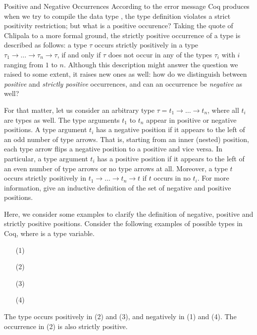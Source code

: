 \begin{excursus}{Positive and Negative Occurrences}
According to the error message Coq produces when we try to compile the data type , the type definition violates a strict positivity restriction; but what is a positive occurence?
Taking the quote of Chlipala to a more formal ground, the strictly positive occurrence of a type is described as follows: a type $\tau$ occurs strictly positively in a type $\tau_1\rightarrow \dots \rightarrow \tau_n \rightarrow \tau$, if and only if $\tau$ does not occur in any of the types $\tau_i$ with $i$ ranging from $1$ to $n$.
Although this description might answer the question we raised to some extent, it raises new ones as well: how do we distinguish between \emph{positive} and \emph{strictly positive} occurrences, and can an occurrence be \emph{negative} as well?

For that matter, let us consider an arbitrary type $\tau = t_1 \rightarrow \dots \rightarrow t_n$, where all $t_i$ are types as well.
The type arguments $t_1$ to $t_n$ appear in positive or negative positions.
A type argument $t_i$ has a negative position if it appears to the left of an odd number of type arrows.
That is, starting from an inner (nested) position, each type arrow flips a negative position to a positive and vice versa.
In particular, a type argument $t_i$ has a positive position if it appears to the left of an even number of type arrows or no type arrows at all.
Moreover, a type $t$ occurs strictly positively in $t_1 \rightarrow \dots \rightarrow t_n \rightarrow t$ if $t$ occurs in no $t_i$.
For more information, \citet{blanqui2002inductivedatatype}  give an inductive definition of the set of negative and positive positions.

Here, we consider some examples to clarify the definition of negative, positive and strictly positive positions.
Consider the following examples of possible types in Coq, where  is a type variable.

\begin{enumerate}
\item[(1)] 
\item[(2)] 
\item[(3)] 
\item[(4)] 
\end{enumerate}

The type  occurs positively in (2) and (3), and negatively in (1) and (4).
The occurrence in (2) is also strictly positive.


\end{excursus}
